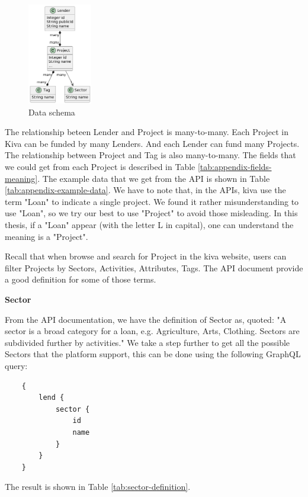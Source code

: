 \begin{figure}[H]
	\centering
	\includegraphics[width=0.25\textwidth]{images/graphuml/dataschema.png}
	\caption{Data schema}
	\label{fig:data-schema}
\end{figure}

The relationship beteen Lender and Project is many-to-many.
Each Project in Kiva can be funded by many Lenders.
And each Lender can fund many Projects.
The relationship between Project and Tag is also many-to-many.
The fields that we could get from each Project is described in Table \ref{tab:appendix-fields-meaning}.
The example data that we get from the API is shown in Table \ref{tab:appendix-example-data}.
We have to note that, in the APIs, kiva use the term "Loan" to indicate a single project.
We found it rather misunderstanding to use "Loan", so we try our best to use "Project" to avoid those misleading.
In this thesis, if a "Loan" appear (with the letter L in capital), one can understand the meaning is a "Project".

Recall that when browse and search for Project in the kiva website,
users can filter Projects by Sectors, Activities, Attributes, Tags.
The API document provide a good definition for some of those terms.

\textbf{Sector}

From the API documentation, we have the definition of Sector as, quoted:
"A sector is a broad category for a loan, e.g. Agriculture, Arts, Clothing. Sectors are subdivided further by activities."
We take a step further to get all the possible Sectors that the platform support,
this can be done using the following GraphQL query:

\begin{lstlisting}
    {
        lend {
            sector {
                id
                name
            }
        }
    }
\end{lstlisting}

The result is shown in Table \ref{tab:sector-definition}.

